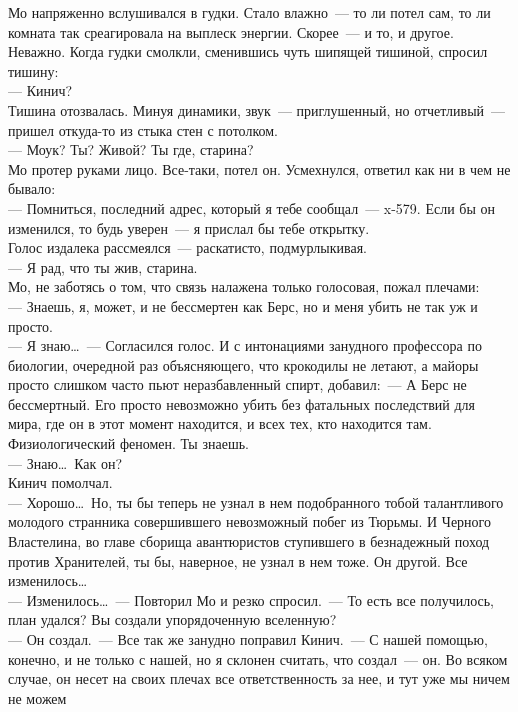 Мо напряженно вслушивался в гудки. Стало влажно~--- то ли потел сам, то ли 
комната так среагировала на выплеск энергии. Скорее~--- и то, и другое. Неважно. Когда 
гудки смолкли, сменившись чуть шипящей тишиной, спросил тишину:\\
--- Кинич?\\
Тишина отозвалась. Минуя динамики, звук~--- приглушенный, но отчетливый~--- 
пришел откуда-то из стыка стен с потолком. \\
--- Моук? Ты? Живой? Ты где, старина?\\
Мо протер руками лицо. Все-таки, потел он. Усмехнулся, ответил как ни в чем не 
бывало:\\
--- Помниться, последний адрес, который я тебе сообщал~--- x-579. Если бы он 
изменился, то будь уверен~--- я прислал бы тебе открытку.\\
Голос издалека рассмеялся~--- раскатисто, подмурлыкивая.\\
--- Я рад, что ты жив, старина.\\
Мо, не заботясь о том, что связь налажена только голосовая, пожал плечами:\\
--- Знаешь, я, может, и не бессмертен как Берс, но и меня убить не так уж и 
просто.\\
--- Я знаю\ldots~--- Согласился голос. И с интонациями занудного профессора по 
биологии, очередной раз объясняющего, что крокодилы не летают, а майоры просто 
слишком часто пьют неразбавленный спирт, добавил:~--- А Берс не бессмертный. 
Его просто невозможно убить без фатальных последствий для мира, где он в этот 
момент находится, и всех тех, кто находится там. Физиологический феномен. Ты знаешь.\\
--- Знаю\ldots\ Как он?\\
Кинич помолчал.\\
--- Хорошо\ldots\ Но, ты бы теперь не узнал в нем подобранного тобой талантливого 
молодого странника совершившего невозможный побег из Тюрьмы. И Черного 
Властелина, во главе сборища авантюристов ступившего в безнадежный поход против 
Хранителей, ты бы, наверное, не узнал в нем тоже. Он другой. Все 
изменилось\ldots\\
--- Изменилось\ldots~--- Повторил Мо и резко спросил.~--- То есть все 
получилось, план удался? Вы создали упорядоченную вселенную?\\
--- Он создал.~--- Все так же занудно поправил Кинич.~--- С нашей помощью, 
конечно, и не только с нашей, но я склонен считать, что создал~--- он. Во всяком случае, 
он несет на своих плечах все ответственность за нее, и тут уже мы ничем не можем 
